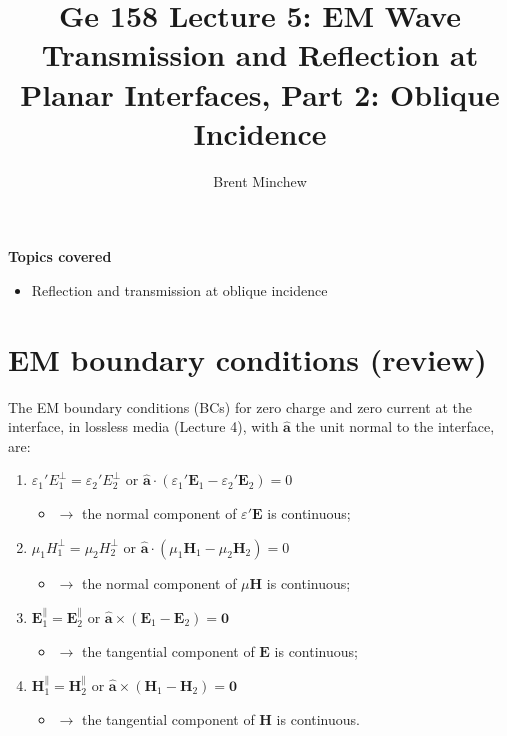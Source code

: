 \documentclass[11pt, oneside]{article}
\title{Ge 158 Lecture 5: EM Wave Transmission and Reflection at Planar Interfaces, Part 2: Oblique Incidence}
\author{Brent Minchew}
\date{}
\begin{document}
\maketitle

\noindent\textbf{Topics covered}
\begin{itemize}
	\item Reflection and transmission at oblique incidence
\end{itemize}

\section{EM boundary conditions (review)}

The EM boundary conditions (BCs) for zero charge and zero current at the interface, in lossless media (Lecture 4), with $\hat{\mathbf{a}}$ the unit normal to the interface, are:
\begin{enumerate}
	\item $\varepsilon_1'E_1^\perp = \varepsilon_2'E_2^\perp$ \quad or \quad $\hat{\mathbf{a}}\cdot\left(\varepsilon_1'\mathbf{E}_1 - \varepsilon_2'\mathbf{E}_2\right) = 0$
	\begin{itemize}
		\item[] $\rightarrow$ the normal component of $\varepsilon'\mathbf{E}$ is continuous;
	\end{itemize}
	\item $\mu_1H_1^\perp = \mu_2H_2^\perp$ \quad or \quad $\hat{\mathbf{a}}\cdot\left(\mu_1\mathbf{H}_1 - \mu_2\mathbf{H}_2\right) = 0$
	\begin{itemize}
		\item[] $\rightarrow$ the normal component of $\mu\mathbf{H}$ is continuous;
	\end{itemize}
	\item $\mathbf{E}_1^\parallel = \mathbf{E}_2^\parallel$ \quad or \quad $\hat{\mathbf{a}}\times\left(\mathbf{E}_1 - \mathbf{E}_2\right) = \mathbf{0}$
	\begin{itemize}
		\item[] $\rightarrow$ the tangential component of $\mathbf{E}$ is continuous;
	\end{itemize}
	\item $\mathbf{H}_1^\parallel = \mathbf{H}_2^\parallel$ \quad or \quad $\hat{\mathbf{a}}\times\left(\mathbf{H}_1 - \mathbf{H}_2\right) = \mathbf{0}$
	\begin{itemize}
		\item[] $\rightarrow$ the tangential component of $\mathbf{H}$ is continuous.
	\end{itemize}
\end{enumerate}
\end{document}

